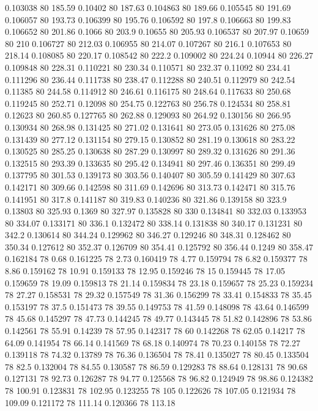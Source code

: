 0.103038 80 185.59
0.10402 80 187.63
0.104863 80 189.66
0.105545 80 191.69
0.106057 80 193.73
0.106399 80 195.76
0.106592 80 197.8
0.106663 80 199.83
0.106652 80 201.86
0.1066 80 203.9
0.10655 80 205.93
0.106537 80 207.97
0.10659 80 210
0.106727 80 212.03
0.106955 80 214.07
0.107267 80 216.1
0.107653 80 218.14
0.108085 80 220.17
0.108542 80 222.2
0.109002 80 224.24
0.10944 80 226.27
0.109848 80 228.31
0.110221 80 230.34
0.110571 80 232.37
0.11092 80 234.41
0.111296 80 236.44
0.111738 80 238.47
0.112288 80 240.51
0.112979 80 242.54
0.11385 80 244.58
0.114912 80 246.61
0.116175 80 248.64
0.117633 80 250.68
0.119245 80 252.71
0.12098 80 254.75
0.122763 80 256.78
0.124534 80 258.81
0.12623 80 260.85
0.127765 80 262.88
0.129093 80 264.92
0.130156 80 266.95
0.130934 80 268.98
0.131425 80 271.02
0.131641 80 273.05
0.131626 80 275.08
0.131439 80 277.12
0.131154 80 279.15
0.130852 80 281.19
0.130618 80 283.22
0.130525 80 285.25
0.130638 80 287.29
0.130997 80 289.32
0.131626 80 291.36
0.132515 80 293.39
0.133635 80 295.42
0.134941 80 297.46
0.136351 80 299.49
0.137795 80 301.53
0.139173 80 303.56
0.140407 80 305.59
0.141429 80 307.63
0.142171 80 309.66
0.142598 80 311.69
0.142696 80 313.73
0.142471 80 315.76
0.141951 80 317.8
0.141187 80 319.83
0.140236 80 321.86
0.139158 80 323.9
0.13803 80 325.93
0.1369 80 327.97
0.135828 80 330
0.134841 80 332.03
0.133953 80 334.07
0.133171 80 336.1
0.132472 80 338.14
0.131838 80 340.17
0.131231 80 342.2
0.130614 80 344.24
0.129962 80 346.27
0.129246 80 348.31
0.128462 80 350.34
0.127612 80 352.37
0.126709 80 354.41
0.125792 80 356.44
0.1249 80 358.47
0.162184 78 0.68
0.161225 78 2.73
0.160419 78 4.77
0.159794 78 6.82
0.159377 78 8.86
0.159162 78 10.91
0.159133 78 12.95
0.159246 78 15
0.159445 78 17.05
0.159659 78 19.09
0.159813 78 21.14
0.159834 78 23.18
0.159657 78 25.23
0.159234 78 27.27
0.158531 78 29.32
0.157549 78 31.36
0.156299 78 33.41
0.154833 78 35.45
0.153197 78 37.5
0.151473 78 39.55
0.149753 78 41.59
0.148098 78 43.64
0.146599 78 45.68
0.145297 78 47.73
0.144245 78 49.77
0.143445 78 51.82
0.142896 78 53.86
0.142561 78 55.91
0.14239 78 57.95
0.142317 78 60
0.142268 78 62.05
0.14217 78 64.09
0.141954 78 66.14
0.141569 78 68.18
0.140974 78 70.23
0.140158 78 72.27
0.139118 78 74.32
0.13789 78 76.36
0.136504 78 78.41
0.135027 78 80.45
0.133504 78 82.5
0.132004 78 84.55
0.130587 78 86.59
0.129283 78 88.64
0.128131 78 90.68
0.127131 78 92.73
0.126287 78 94.77
0.125568 78 96.82
0.124949 78 98.86
0.124382 78 100.91
0.123831 78 102.95
0.123255 78 105
0.122626 78 107.05
0.121934 78 109.09
0.121172 78 111.14
0.120366 78 113.18
